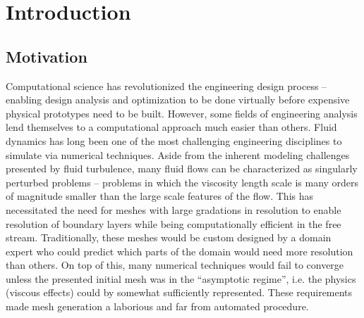 \documentclass[Dissertation.tex]{subfiles}
\begin{document}
\chapter{Introduction}
\label{sec:introduction}
\section{Motivation}

Computational science has revolutionized the engineering design process -- enabling design analysis
and optimization to be done virtually before expensive physical prototypes need to be built.
However, some fields of engineering analysis lend themselves to a computational approach much easier
than others.
Fluid dynamics has long been one of the most challenging engineering disciplines to simulate via numerical techniques.
Aside from the inherent modeling challenges presented by fluid turbulence, many fluid flows can be characterized as singularly perturbed problems
-- problems in which the viscosity length scale is many orders of magnitude smaller than the large scale features of the flow.
This has necessitated the need for meshes with large gradations in resolution to enable resolution of boundary layers while being computationally efficient in the free stream.
Traditionally, these meshes would be custom designed by a domain expert who could predict which parts of the domain would need more resolution than others.
On top of this, many numerical techniques would fail to converge unless the presented initial mesh was in the ``asymptotic regime'',
i.e. the physics (viscous effects) could by somewhat sufficiently represented.
These requirements made mesh generation a laborious and far from automated procedure.
\end{document}
